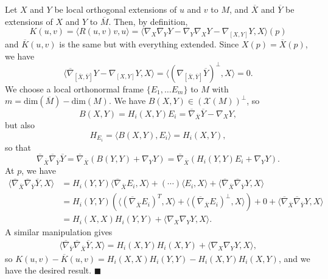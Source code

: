 \documentclass[letter-paper]{tufte-book}
\newenvironment{proof}[1][Proof]{\begin{trivlist}
\item[\hskip \labelsep {\bfseries #1}]}{\end{trivlist}}
\newcommand{\qed}{\hfill$\blacksquare$}
\begin{document}
\begin{proof}
  Let $X$ and $Y$ be local orthogonal extensions of $u$ and $v$ to $M$, and $\overline{X}$ and $\overline{Y}$ be extensions of $X$ and $Y$ to $\overline{M}$. Then, by definition,
  \begin{equation*}
    K(u,v) = \langle R(u,v)v, u\rangle = \langle \nabla_X \nabla_Y Y - \nabla_Y \nabla_X Y - \nabla_{[X,Y]} Y, X\rangle(p)
  \end{equation*}
  and $\overline{K}(u,v)$ is the same but with everything extended. Since $X(p) = \overline{X}(p)$, we have
  \begin{equation*}
    \langle \overline{\nabla}_{[\overline{X}, \overline{Y}]} Y - \nabla_{[X,Y]}Y, X \rangle = \langle (\nabla_{[\overline{X}, \overline{Y}]} \overline{Y})^\perp, X\rangle = 0.
  \end{equation*}
  We choose a local orthonormal frame $\{E_1, \ldots E_m\}$ to $M$ with $m = \mbox{dim}(\overline{M}) - \mbox{dim}(M)$. We have $B(X,Y) \in (\mathcal{X}(M))^\perp$, so
  \begin{equation*}
    B(X,Y) = H_i(X,Y)E_i = \overline{\nabla}_{\overline{X}} \overline{Y} - \nabla_X Y,
  \end{equation*}
  but also
  \begin{equation*}
    H_{E_i} = \langle B(X,Y), E_i \rangle = H_i(X,Y),
  \end{equation*}
  so that
  \begin{equation*}
    \overline{\nabla}_{\overline{X}} \overline{\nabla}_{\overline{Y}} \overline{Y} = \overline{\nabla}_{\overline{X}}\left(B(Y,Y) + \nabla_Y Y\right) = \overline{\nabla}_{\overline{X}} \left(H_i(Y,Y) E_i + \nabla_Y Y\right).
  \end{equation*}
  At $p$, we have
  \begin{align*}
    \langle \overline{\nabla}_{\overline{X}} \overline{\nabla}_{\overline{Y}} \overline{Y}, X \rangle
      &= H_i(Y,Y) \langle \overline{\nabla}_{\overline{X}} E_i, X\rangle + (\cdots) \langle E_i, X\rangle + \langle \overline{\nabla}_{\overline{X}} \overline{\nabla}_{\overline{Y}} Y, X \rangle\\
      &= H_i(Y,Y) \left(\langle (\overline{\nabla}_{\overline{X}} E_i)^T, X\rangle + \langle (\overline{\nabla}_{\overline{X}} E_i)^\perp, X\rangle\right) + 0 + \langle \overline{\nabla}_{\overline{X}} \overline{\nabla}_{\overline{Y}} Y, X \rangle\\
      &= H_i(X,X) H_i(Y,Y) + \langle \nabla_X \nabla_Y Y, X \rangle.
  \end{align*}
  A similar manipulation gives
  \begin{align*}
    \langle \overline{\nabla}_{\overline{Y}} \overline{\nabla}_{\overline{X}} \overline{Y}, X \rangle = H_i(X,Y) H_i(X,Y) + \langle \nabla_X \nabla_Y Y, X \rangle,
  \end{align*}
  so $K(u,v) - \overline{K}(u,v) = H_i(X,X) H_i(Y,Y) - H_i(X,Y)H_i(X,Y)$, and we have the desired result. \qed
\end{proof}
\end{document}

